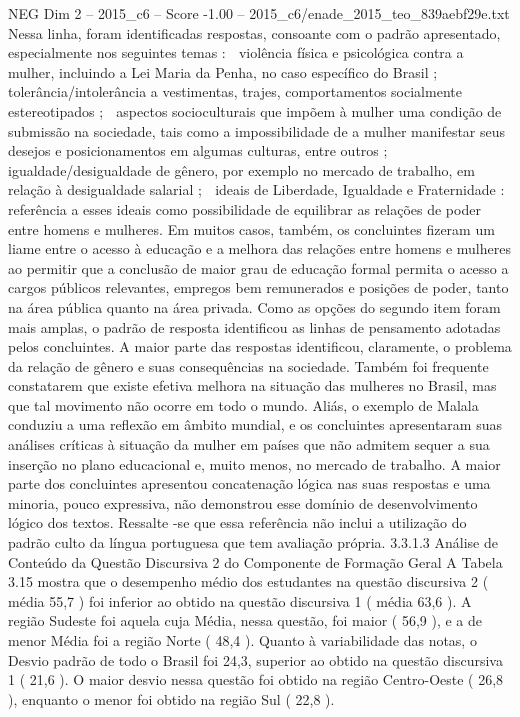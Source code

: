 \begin{textsample}{NEG Dim 2 – 2015\_c6 – Score -1.00 – 2015\_c6/enade\_2015\_teo\_839aebf29e.txt}
Nessa linha, foram identificadas respostas, consoante com o padrão apresentado, especialmente nos seguintes temas :  violência física e psicológica contra a mulher, incluindo a Lei Maria da Penha, no caso específico do Brasil ;  tolerância/intolerância a vestimentas, trajes, comportamentos socialmente estereotipados ;  aspectos socioculturais que impõem à mulher uma condição de submissão na sociedade, tais como a impossibilidade de a mulher manifestar seus desejos e posicionamentos em algumas culturas, entre outros ;  igualdade/desigualdade de gênero, por exemplo no mercado de trabalho, em relação à desigualdade salarial ;  ideais de Liberdade, Igualdade e Fraternidade : referência a esses ideais como possibilidade de equilibrar as relações de poder entre homens e mulheres.
Em muitos casos, também, os concluintes fizeram um liame entre o acesso à educação e a melhora das relações entre homens e mulheres ao permitir que a conclusão de maior grau de educação formal permita o acesso a cargos públicos relevantes, empregos bem remunerados e posições de poder, tanto na área pública quanto na área privada.
Como as opções do segundo item foram mais amplas, o padrão de resposta identificou as linhas de pensamento adotadas pelos concluintes.
A maior parte das respostas identificou, claramente, o problema da relação de gênero e suas consequências na sociedade.
Também foi frequente constatarem que existe efetiva melhora na situação das mulheres no Brasil, mas que tal movimento não ocorre em todo o mundo.
Aliás, o exemplo de Malala conduziu a uma reflexão em âmbito mundial, e os concluintes apresentaram suas análises críticas à situação da mulher em países que não admitem sequer a sua inserção no plano educacional e, muito menos, no mercado de trabalho.
A maior parte dos concluintes apresentou concatenação lógica nas suas respostas e uma minoria, pouco expressiva, não demonstrou esse domínio de desenvolvimento lógico dos textos.
Ressalte -se que essa referência não inclui a utilização do padrão culto da língua portuguesa que tem avaliação própria. 3.3.1.3 Análise de Conteúdo da Questão Discursiva 2 do Componente de Formação Geral A Tabela 3.15 mostra que o desempenho médio dos estudantes na questão discursiva 2 ( média 55,7 ) foi inferior ao obtido na questão discursiva 1 ( média 63,6 ).
A região Sudeste foi aquela cuja Média, nessa questão, foi maior ( 56,9 ), e a de menor Média foi a região Norte ( 48,4 ).
Quanto à variabilidade das notas, o Desvio padrão de todo o Brasil foi 24,3, superior ao obtido na questão discursiva 1 ( 21,6 ).
O maior desvio nessa questão foi obtido na região Centro-Oeste ( 26,8 ), enquanto o menor foi obtido na região Sul ( 22,8 ).

\end{textsample}
